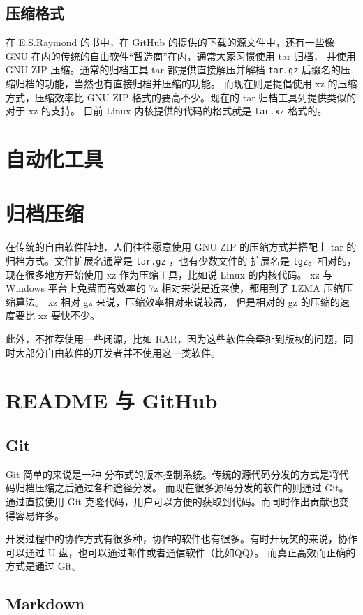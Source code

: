 \documentclass{ctexart}
\begin{document}
\subsection{压缩格式}
在 E.S.Raymond 的书中，在 GitHub 的提供的下载的源文件中，还有一些像 GNU 在内的传统的自由软件“智造商”在内，通常大家习惯使用 tar 归档，
并使用 GNU ZIP 压缩。通常的归档工具 tar 都提供直接解压并解档 \verb|tar.gz| 后缀名的压缩归档的功能，当然也有直接归档并压缩的功能。
而现在则是提倡使用 xz 的压缩方式，压缩效率比 GNU ZIP 格式的要高不少。现在的 tar 归档工具列提供类似的对于 xz 的支持。
目前 Linux 内核提供的代码的格式就是 \verb|tar.xz| 格式的。

\section{自动化工具}



\section{归档压缩}
在传统的自由软件阵地，人们往往愿意使用 GNU ZIP 的压缩方式并搭配上 tar 的归档方式。文件扩展名通常是 \verb|tar.gz| ，也有少数文件的
扩展名是 \verb|tgz|。相对的，现在很多地方开始使用 xz 作为压缩工具，比如说 Linux 的内核代码。
xz 与 Windows 平台上免费而高效率的 7z 相对来说是近亲使，都用到了 LZMA 压缩压缩算法。 xz 相对 gz 来说，压缩效率相对来说较高，
但是相对的 gz 的压缩的速度要比 xz 要快不少。

此外，不推荐使用一些闭源，比如 RAR，因为这些软件会牵扯到版权的问题，同时大部分自由软件的开发者并不使用这一类软件。

\section{README 与 GitHub}
\label{readmeNgithub}
\subsection{Git}
Git 简单的来说是一种 分布式的版本控制系统。传统的源代码分发的方式是将代码归档压缩之后通过各种途径分发。
而现在很多源码分发的软件的则通过 Git。 通过直接使用 Git 克隆代码，用户可以方便的获取到代码。而同时作出贡献也变得容易许多。

开发过程中的协作方式有很多种，协作的软件也有很多。有时开玩笑的来说，协作可以通过 U 盘，也可以通过邮件或者通信软件（比如QQ）。
而真正高效而正确的方式是通过 Git。
\subsection{Markdown}
\end{document}

